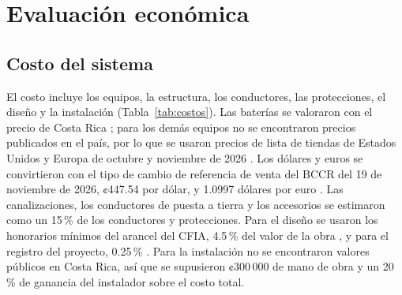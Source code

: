 \section{Evaluación económica}\label{sec:economia}

\subsection{Costo del sistema}

El costo incluye los equipos, la estructura, los conductores, las protecciones, el diseño y la instalación (Tabla~\ref{tab:costos}). Las baterías se valoraron con el precio de Costa Rica \cite{kuat}; para los demás equipos no se encontraron precios publicados en el país, por lo que se usaron precios de lista de tiendas de Estados Unidos y Europa de octubre y noviembre de 2026 \cite{precio_modulo, precio_mppt, precio_mp, pes, elliott, standard, zoro}. Los dólares y euros se convirtieron con el tipo de cambio de referencia de venta del BCCR del 19 de noviembre de 2026, ¢447.54 por dólar, y 1.0997 dólares por euro \cite{bccr}. Las canalizaciones, los conductores de puesta a tierra y los accesorios se estimaron como un 15\,\% de los conductores y protecciones. Para el diseño se usaron los honorarios mínimos del arancel del CFIA, 4.5\,\% del valor de la obra \cite{cfia_arancel}, y para el registro del proyecto, 0.25\,\% \cite{cfia_registro}. Para la instalación no se encontraron valores públicos en Costa Rica, así que se supusieron ¢300\,000 de mano de obra y un 20\,\% de ganancia del instalador sobre el costo total.

